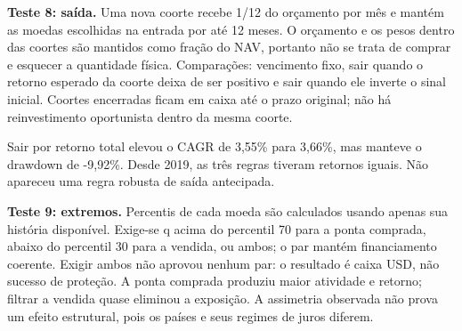 \documentclass[11pt,a4paper]{article}
\begin{document}
\textbf{Teste 8: saída.} Uma nova coorte recebe 1/12 do orçamento por mês e mantém as moedas escolhidas na entrada por até 12 meses. O orçamento e os pesos dentro das coortes são mantidos como fração do NAV, portanto não se trata de comprar e esquecer a quantidade física. Comparações: vencimento fixo, sair quando o retorno esperado da coorte deixa de ser positivo e sair quando ele inverte o sinal inicial. Coortes encerradas ficam em caixa até o prazo original; não há reinvestimento oportunista dentro da mesma coorte.

Sair por retorno total elevou o CAGR de 3,55\% para 3,66\%, mas manteve o drawdown de -9,92\%. Desde 2019, as três regras tiveram retornos iguais. Não apareceu uma regra robusta de saída antecipada.

\textbf{Teste 9: extremos.} Percentis de cada moeda são calculados usando apenas sua história disponível. Exige-se q acima do percentil 70 para a ponta comprada, abaixo do percentil 30 para a vendida, ou ambos; o par mantém financiamento coerente. Exigir ambos não aprovou nenhum par: o resultado é caixa USD, não sucesso de proteção. A ponta comprada produziu maior atividade e retorno; filtrar a vendida quase eliminou a exposição. A assimetria observada não prova um efeito estrutural, pois os países e seus regimes de juros diferem.

\clearpage
\end{document}
